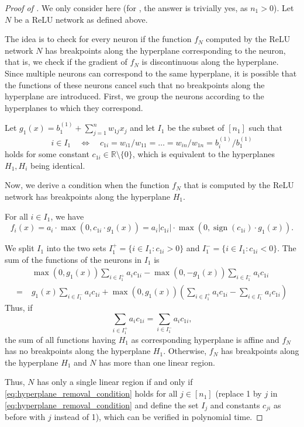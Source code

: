 \documentclass{article}
\DeclareMathOperator{\sign}{sign}
\begin{document}
\begin{proof}[Proof of ]
We only consider  here (for , the answer is trivially yes, as $n_1>0$).
Let $N$ be a ReLU network as defined above.

The idea is to check for every neuron if the function $f_N$ computed by the ReLU network $N$ has breakpoints along the hyperplane corresponding to the neuron, that is, we check if the gradient of $f_N$ is discontinuous along the hyperplane. Since multiple neurons can correspond to the same hyperplane, it is possible that the functions of these neurons cancel such that no breakpoints along the hyperplane are introduced. First, we group the neurons according to the hyperplanes to which they correspond.

Let $g_1(x)=b^{(1)}_1 + \sum_{j=1}^n w_{1j}x_j$ and let $I_1$ be the subset of $[n_1]$ such that
\[
i\in I_1 \quad \iff \quad c_{1i}= w_{i1} / w_{11}= \dots= w_{in} / w_{1n}= b^{(1)}_i / b^{(1)}_1
\]
holds for some constant $c_{1i}\in \mathbb{R}\setminus \{0\}$, which is equivalent to the hyperplanes $H_1,H_i$ being identical.

Now, we derive a condition when the function $f_N$ that is computed by the ReLU network has breakpoints along the hyperplane $H_1$.

For all $i\in I_1$, we have
\begin{equation*}
    f_i(x) = a_i \cdot \max(0, c_{1i}\cdot g_1(x)) = a_i |c_{1i}|\cdot \max(0, \sign(c_{1i})\cdot g_1(x)).
\end{equation*}

We split $I_1$ into the two sets $I_1^+=\{i\in I_1: c_{1i}>0\}$ and $I_1^-=\{i\in I_1: c_{1i}<0\}$.
The sum of the functions of the neurons in $I_1$ is
\begin{align*}
&\max(0, g_1(x))\sum_{i\in I_1^+}a_i c_{1i} - \max(0, -g_1(x))\sum_{i\in I_1^-}a_i c_{1i}\\
=\;&g_1(x)\sum_{i\in I_1^-}a_i c_{1i} + \max(0, g_1(x))\left(\sum_{i\in I_1^+}a_i c_{1i} - \sum_{i\in I_1^-}a_i c_{1i}\right)
\end{align*}
Thus, if 
\begin{equation}\label{eq:hyperplane_removal_condition}
\sum_{i\in I_1^+}a_i c_{1i} = \sum_{i\in I_1^-}a_i c_{1i},
\end{equation}
the sum of all functions having $H_1$ as corresponding hyperplane is affine and $f_N$ has no breakpoints along the hyperplane $H_1$.
Otherwise, $f_N$ has breakpoints along the hyperplane $H_1$ and $N$ has more than one linear region.

Thus, $N$ has only a single linear region if and only if \eqref{eq:hyperplane_removal_condition} holds for all $j\in[n_1]$ (replace 1 by $j$ in \eqref{eq:hyperplane_removal_condition} and define the set $I_j$ and constants $c_{ji}$ as before with $j$ instead of 1), which can be verified in polynomial time.
\end{proof}
\end{document}
